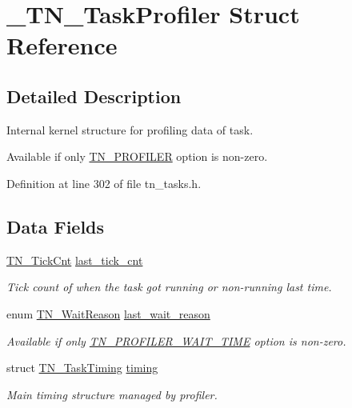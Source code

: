 \hypertarget{struct__TN__TaskProfiler}{}\section{\+\_\+\+T\+N\+\_\+\+Task\+Profiler Struct Reference}
\label{struct__TN__TaskProfiler}


\subsection{Detailed Description}
Internal kernel structure for profiling data of task. 

Available if only {\ttfamily \hyperlink{tn__cfg__default_8h_a49a546b18cc1f75b51d4cf8b290634dd}{T\+N\+\_\+\+P\+R\+O\+F\+I\+L\+ER}} option is non-\/zero. 

Definition at line 302 of file tn\+\_\+tasks.\+h.

\subsection*{Data Fields}
\begin{DoxyCompactItemize}
\item 
\mbox{\label{struct__TN__TaskProfiler_af7e85444a89aa6d17c4eb9115fdea4fb}} 
\hyperlink{tn__common_8h_ac885b63d00c063de61cdbd80bf26d8aa}{T\+N\+\_\+\+Tick\+Cnt} \hyperlink{struct__TN__TaskProfiler_af7e85444a89aa6d17c4eb9115fdea4fb}{last\+\_\+tick\+\_\+cnt}
\begin{DoxyCompactList}\small\item\em Tick count of when the task got running or non-\/running last time. \end{DoxyCompactList}\item 
enum \hyperlink{tn__tasks_8h_a343b0332013c15d6e878c2f60ed2c9b7}{T\+N\+\_\+\+Wait\+Reason} \hyperlink{struct__TN__TaskProfiler_aa587d29f8b4a5252547dc3144735ea55}{last\+\_\+wait\+\_\+reason}
\begin{DoxyCompactList}\small\item\em Available if only {\ttfamily \hyperlink{tn__cfg__default_8h_a1c04db5457adb54f7cc38d42b29a5ad7}{T\+N\+\_\+\+P\+R\+O\+F\+I\+L\+E\+R\+\_\+\+W\+A\+I\+T\+\_\+\+T\+I\+ME}} option is non-\/zero. \end{DoxyCompactList}\item 
struct \hyperlink{structTN__TaskTiming}{T\+N\+\_\+\+Task\+Timing} \hyperlink{struct__TN__TaskProfiler_a49e7b961e080414f407f5c52f9688ed5}{timing}
\begin{DoxyCompactList}\small\item\em Main timing structure managed by profiler. \end{DoxyCompactList}\end{DoxyCompactItemize}


